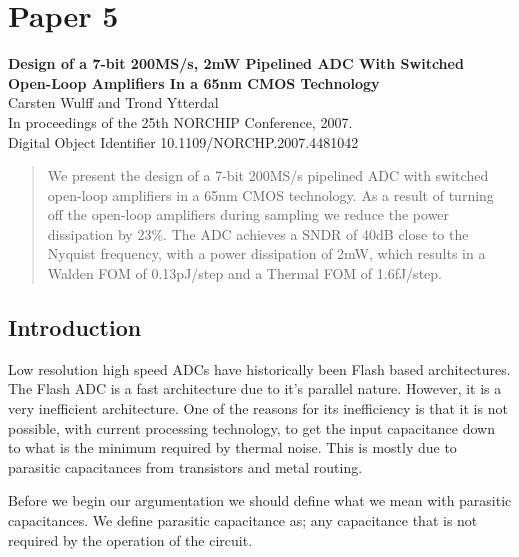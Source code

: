 \chapter{Paper 5}\label{sc:p5}
\textbf{\Large Design of a 7-bit 200MS/s, 2mW Pipelined ADC With Switched
  Open-Loop Amplifiers In a 65nm CMOS Technology}\\
\indent Carsten Wulff and Trond Ytterdal\\
\indent In proceedings of the 25th NORCHIP Conference, 2007.\\
\indent  Digital Object Identifier 10.1109/NORCHP.2007.4481042 \\
\renewcommand\myfigname{p2fig:}
\renewcommand\myeqname{p2eq:}

\begin{abstract}
We present the design of a
7-bit 200MS/s pipelined ADC with switched open-loop amplifiers in a
65nm CMOS technology. As a
result of turning
off the open-loop amplifiers during sampling we reduce the power
dissipation by 23\%. The ADC achieves a SNDR
of 40dB close to the Nyquist frequency, with a power dissipation of
2mW, which results in a 
Walden FOM of 0.13pJ/step and a Thermal FOM of 1.6fJ/step.
\end{abstract}


\section{Introduction}
Low resolution high speed ADCs have historically been
Flash based architectures. The Flash ADC is a fast architecture due to
it's parallel nature. However, it is a very inefficient
architecture. One of the
reasons for its inefficiency is that it is not possible, with current
processing technology, to get the input capacitance down to what is
the minimum required by thermal noise. This is mostly due to parasitic
capacitances from transistors and metal routing. 

Before we begin our argumentation we should define what we mean with
parasitic capacitances. We define parasitic capacitance as; any
capacitance that is not required by the operation of the circuit.


